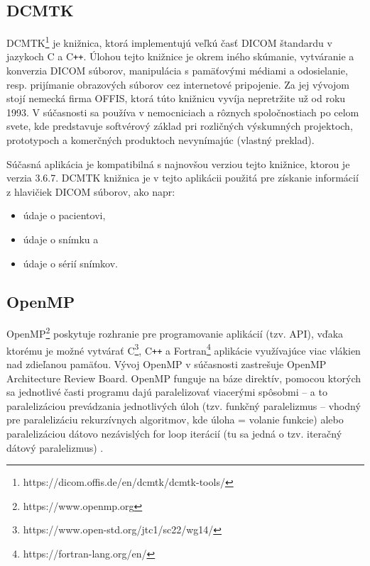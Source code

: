 \subsection {DCMTK}\label{dcmtk}
DCMTK\footnote{https://dicom.offis.de/en/dcmtk/dcmtk-tools/} je knižnica, ktorá implementujú veľkú časť DICOM štandardu v jazykoch C a C\texttt{++}. Úlohou tejto knižnice je okrem iného skúmanie, vytváranie a konverzia DICOM súborov, manipulácia s pamäťovými médiami a odosielanie, resp. prijímanie obrazových súborov cez internetové pripojenie. Za jej vývojom stojí nemecká firma OFFIS, ktorá túto knižnicu vyvíja nepretržite už od roku 1993. V súčasnosti sa používa v nemocniciach a rôznych spoločnostiach po celom svete, kde predstavuje softvérový základ pri rozličných výskumných projektoch, prototypoch a komerčných produktoch nevynímajúc \cite{dcmtk_description} (vlastný preklad). \newline

Súčasná aplikácia je kompatibilná s najnovšou verziou tejto knižnice, ktorou je verzia 3.6.7. DCMTK knižnica je v tejto aplikácii použitá pre získanie informácií z hlavičiek DICOM súborov, ako napr:

\begin{itemize}
\item {údaje o pacientovi,}
\item {údaje o snímku a}
\item {údaje o sérií snímkov.}
\end{itemize}

\subsection {OpenMP}\label{openmp}
OpenMP\footnote{https://www.openmp.org} poskytuje rozhranie pre programovanie aplikácií (tzv. API), vďaka ktorému je možné vytvárať C\footnote{https://www.open-std.org/jtc1/sc22/wg14/}, C\texttt{++} a Fortran\footnote{https://fortran-lang.org/en/} aplikácie využívajúce viac vlákien nad zdieľanou pamäťou. Vývoj OpenMP v súčasnosti zastrešuje \newline OpenMP Architecture Review Board.
OpenMP funguje na báze direktív, pomocou ktorých sa jednotlivé časti programu dajú paralelizovať viacerými spôsobmi -- a to paralelizáciou prevádzania jednotlivých úloh (tzv. funkčný paralelizmus -- vhodný pre paralelizáciu rekurzívnych algoritmov, kde úloha = volanie funkcie) alebo paralelizáciou dátovo nezávislých for loop iterácií (tu sa jedná o tzv. iteračný dátový paralelizmus) \cite{openmp_description}.

